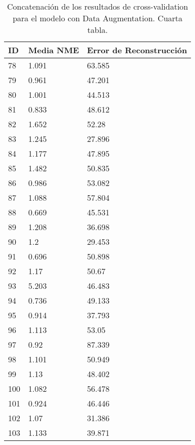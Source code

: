\begin{table}[!ht]
    \centering
    \caption{Concatenación de los resultados de cross-validation para el modelo con Data Augmentation. Cuarta tabla.}
    \begin{tabular}{|l|l|l|}
    \hline
    \cellcolor{gray!25}\textbf{ID} & \cellcolor{gray!25}\textbf{Media NME} & \cellcolor{gray!25}\textbf{Error de Reconstrucción} \\ \hline
        78 & 1.091 & 63.585 \\ \hline
        79 & 0.961 & 47.201 \\ \hline
        80 & 1.001 & 44.513 \\ \hline
        81 & 0.833 & 48.612 \\ \hline
        82 & 1.652 & 52.28 \\ \hline
        83 & 1.245 & 27.896 \\ \hline
        84 & 1.177 & 47.895 \\ \hline
        85 & 1.482 & 50.835 \\ \hline
        86 & 0.986 & 53.082 \\ \hline
        87 & 1.088 & 57.804 \\ \hline
        88 & 0.669 & 45.531 \\ \hline
        89 & 1.208 & 36.698 \\ \hline
        90 & 1.2 & 29.453 \\ \hline
        91 & 0.696 & 50.898 \\ \hline
        92 & 1.17 & 50.67 \\ \hline
        93 & 5.203 & 46.483 \\ \hline
        94 & 0.736 & 49.133 \\ \hline
        95 & 0.914 & 37.793 \\ \hline
        96 & 1.113 & 53.05 \\ \hline
        97 & 0.92 & 87.339 \\ \hline
        98 & 1.101 & 50.949 \\ \hline
        99 & 1.13 & 48.402 \\ \hline
        100 & 1.082 & 56.478 \\ \hline
        101 & 0.924 & 46.446 \\ \hline
        102 & 1.07 & 31.386 \\ \hline
        103 & 1.133 & 39.871 \\ \hline
    \end{tabular}
\end{table}

